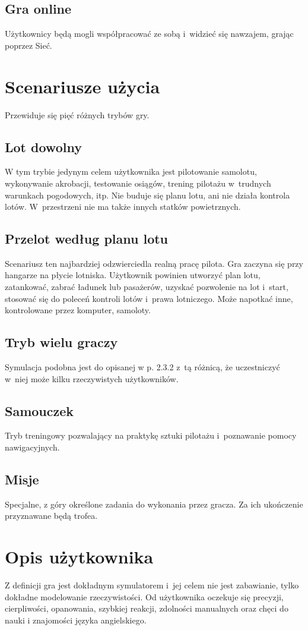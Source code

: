\documentclass{mwrep}
\begin{document}
\subsection{Gra online}
Użytkownicy będą mogli współpracować ze sobą i~widzieć się nawzajem, grając poprzez Sieć.

\section{Scenariusze użycia}
Przewiduje się pięć różnych trybów gry.
\subsection{Lot dowolny}
W tym trybie jedynym celem użytkownika jest pilotowanie samolotu, wykonywanie akrobacji, testowanie osiągów, trening pilotażu w~trudnych warunkach pogodowych, itp. Nie buduje się planu lotu, ani nie działa kontrola lotów. W~przestrzeni nie ma także innych statków powietrznych.
\subsection{Przelot według planu lotu}
Scenariusz ten najbardziej odzwierciedla realną pracę pilota. Gra zaczyna się przy hangarze na płycie lotniska. Użytkownik powinien utworzyć plan lotu, zatankować, zabrać ładunek lub pasażerów, uzyskać pozwolenie na lot i~start, stosować się do poleceń kontroli lotów i~prawa lotniczego. Może napotkać inne, kontrolowane przez komputer, samoloty.
\subsection{Tryb wielu graczy}
Symulacja podobna jest do opisanej w p. 2.3.2 z~tą różnicą, że uczestniczyć w~niej może kilku rzeczywistych użytkowników.
\subsection{Samouczek}
Tryb treningowy pozwalający na praktykę sztuki pilotażu i~poznawanie pomocy nawigacyjnych.
\subsection{Misje}
Specjalne, z góry określone zadania do wykonania przez gracza. Za ich ukończenie przyznawane będą trofea.

\section{Opis użytkownika}
Z definicji gra jest dokładnym symulatorem i~jej celem nie jest zabawianie, tylko dokładne modelowanie rzeczywistości. Od użytkownika oczekuje się precyzji, cierpliwości, opanowania, szybkiej reakcji, zdolności manualnych oraz chęci do nauki i znajomości języka angielskiego.
\end{document}
